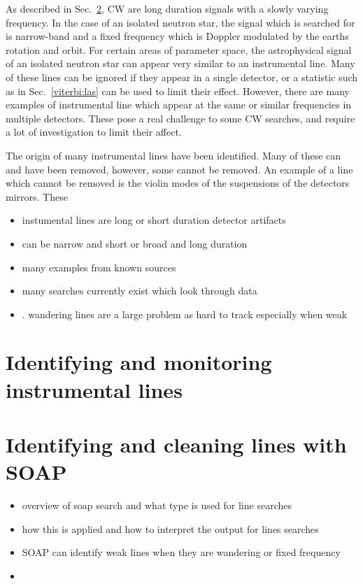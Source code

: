 As described in Sec.~\ref{}, \ac{CW} are long duration signals with a slowly varying frequency.
In the case of an isolated neutron star, the signal which is searched for is narrow-band and a fixed frequency which is Doppler modulated by the earths rotation and orbit.
For certain areas of parameter space, the astrophysical signal of an isolated neutron star can appear very similar to an instrumental line. 
Many of these lines can be ignored if they appear in a single detector, or a statistic such as in Sec.~\ref{viterbi:las} can be used to limit their effect.
However, there are many examples of instrumental line which appear at the same or similar frequencies in multiple detectors.
These pose a real challenge to some \ac{CW} searches, and require a lot of investigation to limit their affect.



The origin of many instrumental lines have been identified.
Many of these can and have been removed, however, some cannot be removed. 
An example of a line which cannot be removed is the violin modes of the suspensions of the detectors mirrors. 
These 




\begin{itemize}
    \item instumental lines are long or short duration detector artifacts
    \item can be narrow and short or broad and long duration
    \item many examples from known sources
    \item many searches currently exist which look through data
    \item . wandering lines are a large problem as hard to track especially when weak
\end{itemize}

\section{Identifying and monitoring instrumental lines}



\section{Identifying and cleaning lines with SOAP}

\begin{itemize}
    \item overview of soap search and what type is used for line searches
    \item how this is applied and how to interpret the output for lines searches
    \item SOAP can identify weak lines when they are wandering or fixed frequency
    \item 
\end{itemize}


